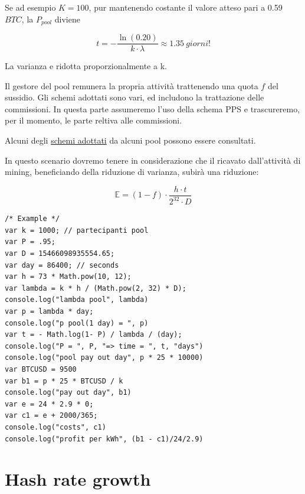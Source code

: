 \documentclass{book}
\theoremstyle{definition}
\begin{document}
Se ad esempio $K = 100$, pur mantenendo costante il valore atteso pari a 0.59 $BTC$, la $P_{pool}$ diviene

\begin{equation}
    t = -\frac{\ln(0.20)}{k \cdot \lambda} \approx 1.35 \ \textit{giorni!} 
\end{equation}

La varianza e ridotta proporzionalmente a k.

Il gestore del pool remunera la propria attività trattenendo una quota $f$ del sussidio. Gli schemi adottati sono vari, ed includono la trattazione delle commissioni. 
In questa parte assumeremo l'uso della schema PPS e trascureremo, per il momento, le parte reltiva alle commissioni.

Alcuni degli \href{https://en.bitcoin.it/wiki/Comparison_of_mining_pools}{schemi adottati} da alcuni pool possono essere consultati.

In questo scenario dovremo tenere in considerazione che il ricavato dall'attività di mining, beneficiando della riduzione di varianza,
subirà una riduzione:

\begin{equation}
    \mathbb{E} = (1 - f) \cdot \frac{h \cdot t}{2^{32} \cdot D} \label{adjusted_lambda}
\end{equation}

\lstset{style=mystyle}
\begin{lstlisting}[language=VBScript]
/* Example */
var k = 1000; // partecipanti pool
var P = .95;
var D = 15466098935554.65;
var day = 86400; // seconds
var h = 73 * Math.pow(10, 12);
var lambda = k * h / (Math.pow(2, 32) * D);
console.log("lambda pool", lambda)
var p = lambda * day;
console.log("p pool(1 day) = ", p)
var t = - Math.log(1- P) / lambda / (day);
console.log("P = ", P, "=> time = ", t, "days")
console.log("pool pay out day", p * 25 * 10000)
var BTCUSD = 9500
var b1 = p * 25 * BTCUSD / k
console.log("pay out day", b1)
var e = 24 * 2.9 * 0;
var c1 = e + 2000/365;
console.log("costs", c1)
console.log("profit per kWh", (b1 - c1)/24/2.9)
\end{lstlisting}

\newpage

\section{Hash rate growth}
\end{document}
